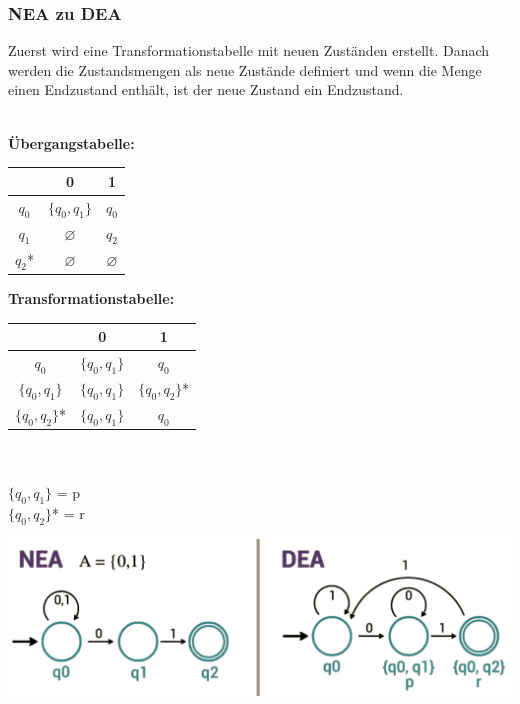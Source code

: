 \documentclass[12pt,a4paper]{article}
\begin{document}
	\subsubsection{NEA zu DEA}
	Zuerst wird eine Transformationstabelle mit neuen Zuständen erstellt. Danach werden die Zustandsmengen als neue Zustände definiert und wenn die Menge einen Endzustand enthält, ist der neue Zustand ein Endzustand.\\\\
	\begin{minipage}[c]{0.5\textwidth}
		\textbf{Übergangstabelle:}\\
		\begin{tabular}[h]{c | c | c}
			& 0 & 1\\
			\hline
			$q_0$ & $\{q_0, q_1\}$ & $q_0$\\
			\hline
			$q_1$ & $\varnothing$ & $q_2$\\
			\hline
			$q_2$* & $\varnothing$ & $\varnothing $
		\end{tabular}
	\end{minipage}
	\hfill
	\begin{minipage}[c]{0.5\textwidth}
		\textbf{Transformationstabelle:}\\
		\begin{tabular}[h]{c | c | c}
			& 0 & 1\\
			\hline
			$q_0$ & $\{q_0, q_1\}$ & $q_0$\\
			\hline
			$\{q_0, q_1\}$ & $\{q_0, q_1\}$ & $\{q_0, q_2\}$*\\
			\hline
			$\{q_0, q_2\}$* & $\{q_0, q_1\}$ & $q_0$
		\end{tabular}\\\\
		$\{q_0, q_1\}$ = p\\
		$\{q_0, q_2\}$* = r
	\end{minipage}
	
	\begin{center}
		\includegraphics[width=\textwidth]{Bilder/NEAzuDEA.PNG}
	\end{center}
\end{document}
